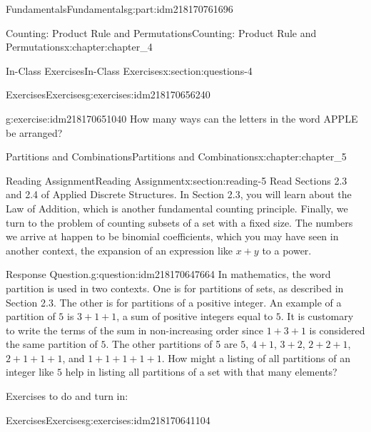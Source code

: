 \documentclass[oneside,10pt,]{book}
\numberwithin{equation}{section}
\begin{document}
\begin{partptx}{Fundamentals}{}{Fundamentals}{}{}{g:part:idm218170761696}
\begin{chapterptx}{Counting: Product Rule and Permutations}{}{Counting: Product Rule and Permutations}{}{}{x:chapter:chapter_4}
\begin{sectionptx}{In-Class Exercises}{}{In-Class Exercises}{}{}{x:section:questions-4}
\begin{exercises-subsection-numberless}{Exercises}{}{Exercises}{}{}{g:exercises:idm218170656240}
\begin{exercisegroup}
\begin{divisionexerciseeg}{4}{}{}{g:exercise:idm218170651040}
How many ways can the letters in the word APPLE be arranged?%
\end{divisionexerciseeg}%
\end{exercisegroup}
\par\medskip\noindent
\end{exercises-subsection-numberless}
\end{sectionptx}
\end{chapterptx}
%
\typeout{************************************************}
\typeout{************************************************}
%
\begin{chapterptx}{Partitions and Combinations}{}{Partitions and Combinations}{}{}{x:chapter:chapter_5}
%
%
%
\typeout{************************************************}
\typeout{************************************************}
%
\begin{sectionptx}{Reading Assignment}{}{Reading Assignment}{}{}{x:section:reading-5}
Read Sections 2.3 and 2.4 of Applied Discrete Structures. In Section 2.3, you will learn about the Law of Addition, which is another fundamental counting principle.  Finally, we turn to the problem of counting subsets of a set with a fixed size.  The numbers we arrive at happen to be binomial coefficients, which you may have seen in another context, the expansion of an expression like \(x + y\) to a power.%
\begin{question}{Response Question.}{g:question:idm218170647664}%
In mathematics, the word partition is used in two contexts. One is for partitions of sets, as described in Section 2.3. The other is for partitions of a positive integer.  An example of a partition of \(5\) is \(3+1+1\), a sum of positive integers equal to \(5\). It is customary to write the terms of the sum in non-increasing order since \(1+3+1\) is considered the same partition of \(5\). The other partitions of 5 are \(5\), \(4+1\), \(3+2\), \(2+2+1\), \(2+1+1+1\), and \(1+1+1+1+1\). How might a listing of all partitions of an integer like \(5\) help in listing all partitions of a set with that many elements?%
\end{question}
Exercises to do and turn in:%
%
%
\typeout{************************************************}
\typeout{************************************************}
%
\begin{exercises-subsection-numberless}{Exercises}{}{Exercises}{}{}{g:exercises:idm218170641104}
\par\medskip\noindent%

\end{exercises-subsection-numberless}
\end{sectionptx}
\end{chapterptx}
\end{partptx}
\end{document}
